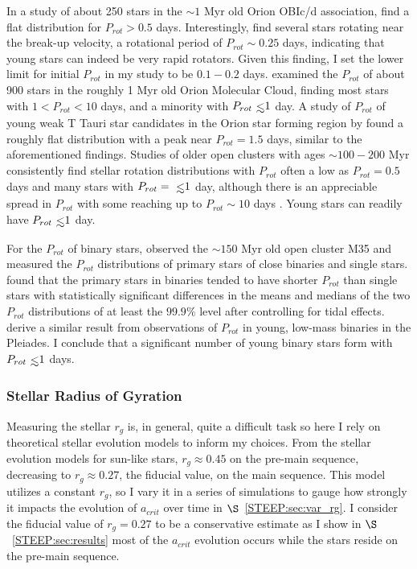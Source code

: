 In a study of about 250 stars in the ${\sim}1$ Myr old Orion OBIc/d association, \citet{Stassun1999} find a flat distribution for $P_{rot} > 0.5$ days.  Interestingly, \citet{Stassun1999} find several stars rotating near the break-up velocity, a rotational period of $P_{rot}{\sim} 0.25$ days, indicating that young stars can indeed be very rapid rotators.  Given this finding, I set the lower limit for initial $P_{rot}$ in my study to be $0.1-0.2$ days.  \citet{Rebull2006} examined the $P_{rot}$ of about 900 stars in the roughly 1 Myr old Orion Molecular Cloud, finding most stars with $1 < P_{rot} < 10$ days, and a minority with $P_{rot} \lsim 1$ day.  A study of $P_{rot}$ of young weak T Tauri star candidates in the Orion star forming region by \citet{Marilli2007} found a roughly flat distribution with a peak near $P_{rot} = 1.5$ days, similar to the aforementioned findings.  Studies of older open clusters with ages ${\sim}100-200$ Myr consistently find stellar rotation distributions with $P_{rot}$ often a low as $P_{rot} = 0.5$ days and many stars with $P_{rot} = \lsim 1$ day, although there is an appreciable spread in $P_{rot}$ with some reaching up to $P_{rot} {\sim} 10$ days \citep[see][]{Marilli2007,Meibom2009,Meibom2011}.  Young stars can readily have $P_{rot} \lsim 1$ day.

For the $P_{rot}$ of binary stars, \citet{Meibom2007} observed the ${\sim}150$ Myr old open cluster M35 and measured the $P_{rot}$ distributions of primary stars of close binaries and single stars.  \citet{Meibom2007} found that the primary stars in binaries tended to have shorter $P_{rot}$ than single stars with statistically significant differences in the means and medians of the two $P_{rot}$ distributions of at least the $99.9\%$ level after controlling for tidal effects.  \citet{Stauffer2016} derive a similar result from observations of $P_{rot}$ in young, low-mass binaries in the Pleiades.  I conclude that a significant number of young binary stars form with $P_{rot} \lsim 1$ days. 

\subsubsection{Stellar Radius of Gyration} \label{STEEP:sec:r_g}

Measuring the stellar $r_g$ is, in general, quite a difficult task so here I rely on theoretical stellar evolution models to inform my choices.  From the \citet{Baraffe2015} stellar evolution models for sun-like stars, $r_g{\approx}0.45$ on the pre-main sequence, decreasing to $r_g{\approx}0.27$, the fiducial value, on the main sequence.  This model utilizes a constant $r_g$, so I vary it in a series of simulations to gauge how strongly it impacts the evolution of $a_{crit}$ over time in $\S$~\ref{STEEP:sec:var_rg}.  I consider the fiducial value of $r_g = 0.27$ to be a conservative estimate as I show in $\S$~\ref{STEEP:sec:results} most of the $a_{crit}$ evolution occurs while the stars reside on the pre-main sequence.

